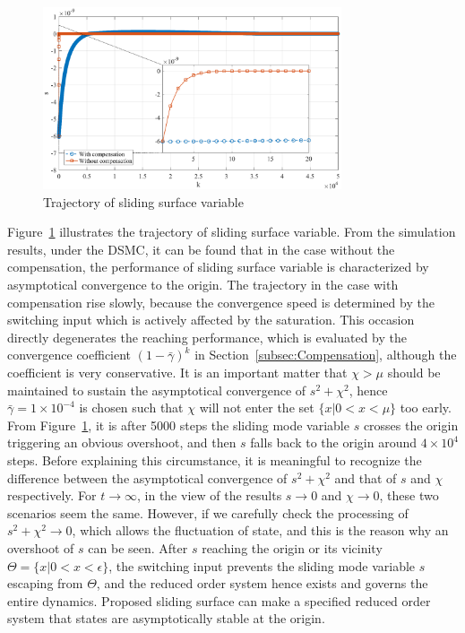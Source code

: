 \documentclass[10pt,final,journal]{IEEEtran}
\begin{document}
\begin{figure}[htbp] 
\centering
\includegraphics[width=250pt]{slidingsurface.eps}
\caption{Trajectory of sliding surface variable} \label{fig:graph_s}
\end{figure} 

Figure~\ref{fig:graph_s} illustrates the trajectory of sliding surface variable. From the simulation results, under the DSMC, it can be found that in the case without the compensation, the performance of sliding surface variable is characterized by asymptotical convergence to the origin. The trajectory in the case with compensation rise slowly, because the convergence speed is determined by the switching input which is actively affected by the saturation. This occasion directly degenerates the reaching performance, which is evaluated by the convergence coefficient $(1-\bar\gamma)^k$ in Section~\ref{subsec:Compensation}, although the coefficient is very conservative. It is an important matter that $\chi>\mu$ should be maintained to sustain the asymptotical convergence of $s^2+\chi^2$, hence $\bar\gamma = 1\times 10^{-4}$ is chosen such that $\chi$ will not enter the set $\{x\vert 0<x<\mu\}$ too early. From Figure~\ref{fig:graph_s}, it is after 5000 steps the sliding mode variable $s$ crosses the origin triggering an obvious overshoot, and then $s$ falls back to the origin around $4\times 10^4$ steps. Before explaining this circumstance, it is meaningful to recognize the difference between the asymptotical convergence of $s^2+\chi^2$ and that of $s$ and $\chi$ respectively. For $t\to\infty$, in the view of the results $s\to 0$ and $\chi\to 0$, these two scenarios seem the same. However, if we carefully check the processing of $s^2+\chi^2\to 0$, which allows the fluctuation of state, and this is the reason why an overshoot of $s$ can be seen.  After $s$ reaching the origin or its vicinity $\Theta=\{x\vert 0<x<\epsilon\}$,  the switching input prevents the sliding mode variable $s$ escaping from $\Theta$, and the reduced order  system hence exists and governs the entire dynamics. Proposed sliding surface can make a specified reduced order  system that states are asymptotically stable at the origin.  
\end{document}
